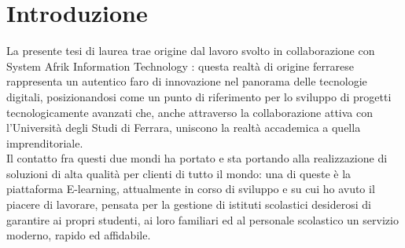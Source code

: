 \documentclass[a4paper, 12pt]{book}
\begin{document}

\titlespacing{\chapter}{0pt}{-20pt}{20pt}

\pagestyle{empty}
\clearpage
\tableofcontents
\thispagestyle{empty}



\chapter*{Introduzione}
\pagestyle{fancy}
\fancyhf{}
\renewcommand{\headrulewidth}{2pt}
\fancyhead[EL]{\textbf{\textsf{\nouppercase\thepage}}}
\fancyhead[ER]{\textbf{\textsf{\nouppercase\leftmark}}}
\fancyhead[OR]{\textbf{\textsf{\nouppercase\thepage}}}
\fancyhead[OL]{\textbf{\textsf{\nouppercase {\rightmark}}}}

\thispagestyle{empty}


La presente tesi di laurea trae origine dal lavoro svolto in collaborazione con System Afrik Information Technology \cite{syait}: questa realtà di origine ferrarese
rappresenta un autentico faro di innovazione nel panorama delle tecnologie digitali, posizionandosi come un punto di riferimento per lo sviluppo di
progetti tecnologicamente avanzati che, anche attraverso la collaborazione attiva con l'Università degli Studi di Ferrara,
uniscono la realtà accademica a quella imprenditoriale.\\

Il contatto fra questi due mondi ha portato e sta portando alla realizzazione di soluzioni di alta qualità per clienti di tutto il mondo: una di queste
è la piattaforma E-learning, attualmente in corso di sviluppo e su cui ho avuto il piacere di lavorare, pensata per la gestione di istituti scolastici
desiderosi di garantire ai propri studenti, ai loro familiari ed al personale scolastico un servizio moderno, rapido ed affidabile.\\
\end{document}
